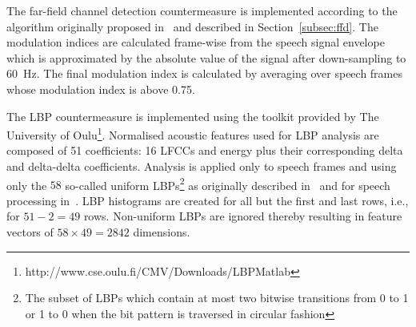 

The far-field channel detection countermeasure is implemented according to the algorithm originally proposed in~\cite{Villalba2011} and described in Section~\ref{subsec:ffd}. The modulation indices are calculated frame-wise from the speech signal envelope which is approximated by the absolute value of the signal after down-sampling to 60~Hz.  The final modulation index is calculated by averaging over speech frames whose modulation index is above 0.75.  


The LBP countermeasure is implemented using the toolkit provided by The University of Oulu\footnote{http://www.cse.oulu.fi/CMV/Downloads/LBPMatlab}.
Normalised acoustic features used for LBP analysis are composed of 51 coefficients: 16 LFCCs and energy plus their corresponding delta and delta-delta coefficients.  Analysis is applied only to speech frames and using only the $58$ so-called uniform LBPs\footnote{The subset of LBPs which contain at most two bitwise transitions from 0 to 1 or 1 to 0 when the bit pattern is traversed in circular fashion} as originally described in~\cite{Ojala2002} and for speech processing in~\cite{Alegre2013a}.  %
LBP histograms are created for all but the first and last rows, i.e., for $51 - 2 = 49$ rows.  Non-uniform LBPs are ignored thereby resulting in feature vectors of $58 \times 49 = 2842$ dimensions. 

